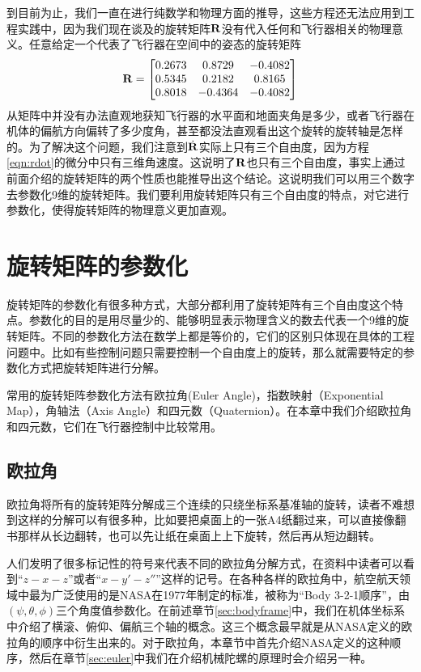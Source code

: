 \documentclass[11pt]{article}
\begin{document}
到目前为止，我们一直在进行纯数学和物理方面的推导，这些方程还无法应用到工程实践中，因为我们现在谈及的旋转矩阵${\bf R}$没有代入任何和飞行器相关的物理意义。任意给定一个代表了飞行器在空间中的姿态的旋转矩阵
$$
{\bf R} = 
\begin{bmatrix}
0.2673 & 0.8729 & -0.4082 \\
0.5345 & 0.2182 & 0.8165 \\
0.8018 & -0.4364 & -0.4082
\end{bmatrix}
$$
从矩阵中并没有办法直观地获知飞行器的水平面和地面夹角是多少，或者飞行器在机体的偏航方向偏转了多少度角，甚至都没法直观看出这个旋转的旋转轴是怎样的。为了解决这个问题，我们注意到$\dot{{\bf R}}$实际上只有三个自由度，因为方程\ref{eqn:rdot}的微分中只有三维角速度。这说明了${\bf R}$也只有三个自由度，事实上通过前面介绍的旋转矩阵的两个性质也能推导出这个结论。这说明我们可以用三个数字去参数化9维的旋转矩阵。我们要利用旋转矩阵只有三个自由度的特点，对它进行参数化，使得旋转矩阵的物理意义更加直观。

\section{旋转矩阵的参数化}
旋转矩阵的参数化有很多种方式，大部分都利用了旋转矩阵有三个自由度这个特点。参数化的目的是用尽量少的、能够明显表示物理含义的数去代表一个9维的旋转矩阵。不同的参数化方法在数学上都是等价的，它们的区别只体现在具体的工程问题中。比如有些控制问题只需要控制一个自由度上的旋转，那么就需要特定的参数化方式把旋转矩阵进行分解。

常用的旋转矩阵参数化方法有欧拉角(Euler Angle)，指数映射（Exponential Map），角轴法（Axis Angle）和四元数（Quaternion）。在本章中我们介绍欧拉角和四元数，它们在飞行器控制中比较常用。
\subsection{欧拉角}
欧拉角将所有的旋转矩阵分解成三个连续的只绕坐标系基准轴的旋转，读者不难想到这样的分解可以有很多种，比如要把桌面上的一张A4纸翻过来，可以直接像翻书那样从长边翻转，也可以先让纸在桌面上上下旋转，然后再从短边翻转。

人们发明了很多标记性的符号来代表不同的欧拉角分解方式，在资料中读者可以看到“$z-x-z$”或者“$x-y'-z''$”这样的记号。在各种各样的欧拉角中，航空航天领域中最为广泛使用的是NASA在1977年制定的标准，被称为“Body 3-2-1顺序”，由$(\psi, \theta, \phi)$三个角度值参数化\cite{nasa}。在前述章节\ref{sec:bodyframe}中，我们在机体坐标系中介绍了横滚、俯仰、偏航三个轴的概念。这三个概念最早就是从NASA定义的欧拉角的顺序中衍生出来的。对于欧拉角，本章节中首先介绍NASA定义的这种顺序，然后在章节\ref{sec:euler}中我们在介绍机械陀螺的原理时会介绍另一种。
\end{document}
